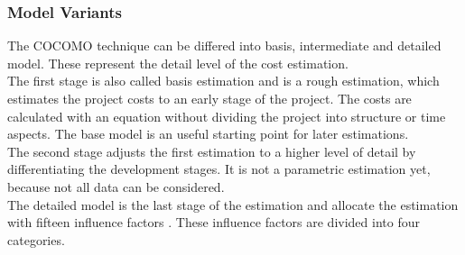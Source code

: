 \subsubsection{Model Variants}

The COCOMO technique can be differed into basis, intermediate and detailed model. These represent the detail level of the cost estimation.\\
The first stage is also called basis estimation and is a rough estimation, which estimates the project costs to an early stage of the project. The costs are calculated with an equation without dividing the project into structure or time aspects. The base model is an useful starting point for later estimations.\\
The second stage adjusts the first estimation to a higher level of detail by differentiating the development stages. It is not a parametric estimation yet, because not all data can be considered.\\
The detailed model is the last stage of the estimation and allocate the estimation with fifteen influence factors \cite{jenny}. These influence factors are divided into four categories.\\
